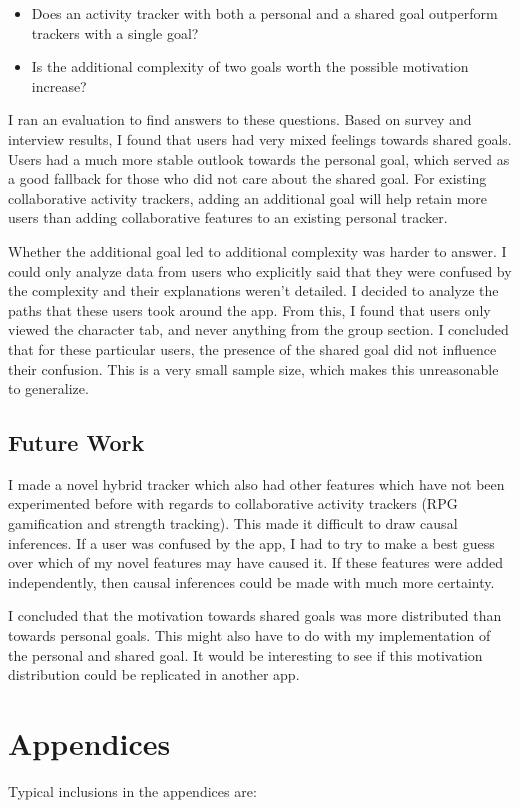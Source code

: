 \documentclass{l4proj}
\begin{document}
\begin{itemize}
  \item Does an activity tracker with both a personal and a shared goal outperform trackers with a single goal?
  \item Is the additional complexity of two goals worth the possible motivation increase?
\end{itemize}

I ran an evaluation to find answers to these questions. Based on survey and interview results, I found that users had very mixed feelings towards shared goals. Users had a much more stable outlook towards the personal goal, which served as a good fallback for those who did not care about the shared goal. For existing collaborative activity trackers, adding an additional goal will help retain more users than adding collaborative features to an existing personal tracker.

Whether the additional goal led to additional complexity was harder to answer. I could only analyze data from users who explicitly said that they were confused by the complexity and their explanations weren't detailed. I decided to analyze the paths that these users took around the app. From this, I found that users only viewed the character tab, and never anything from the group section. I concluded that for these particular users, the presence of the shared goal did not influence their confusion. This is a very small sample size, which makes this unreasonable to generalize.

\section{Future Work}
I made a novel hybrid tracker which also had other features which have not been experimented before with regards to collaborative activity trackers (RPG gamification and strength tracking). This made it difficult to draw causal inferences. If a user was confused by the app, I had to try to make a best guess over which of my novel features may have caused it. If these features were added independently, then causal inferences could be made with much more certainty. 

I concluded that the motivation towards shared goals was more distributed than towards personal goals. This might also have to do with my implementation of the personal and shared goal. It would be interesting to see if this motivation distribution could be replicated in another app.





\chapter{Appendices}


Typical inclusions in the appendices are:
\end{document}
